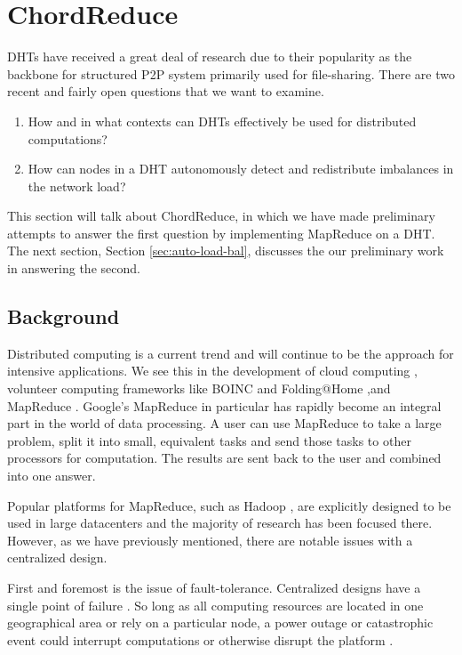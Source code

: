 \section{ChordReduce}
DHTs have received a great deal of research due to their popularity as the backbone for structured P2P system primarily used for file-sharing.
There are two recent and fairly open questions that we want to examine.

\begin{enumerate}
	\item How and in what contexts  can DHTs effectively be used for distributed computations?  
	\item How can nodes in a DHT autonomously detect and redistribute imbalances in the network load?
\end{enumerate}

This section will talk about ChordReduce, in which we have made preliminary attempts to answer the first question by implementing MapReduce on a DHT.
The next section, Section \ref{sec:auto-load-bal}, discusses the our preliminary work in answering the second.

\subsection{Background}

Distributed computing is a current trend and will continue to be the approach for intensive  applications.
We see this in the development of cloud computing \cite{p2p-cloud}, volunteer computing frameworks like BOINC \cite{anderson2004boinc} and Folding@Home \cite{larson2002folding},and MapReduce  \cite{mapreduce}.
Google's MapReduce  in particular has rapidly become an integral part in the world of data processing.  
A user can use MapReduce to take a large problem, split it into small, equivalent tasks and send those tasks to other processors for computation.  
The results are sent back to the user and combined into one answer. 

Popular platforms for MapReduce, such as Hadoop \cite{hadoop}  \cite{shvachko2010hadoop}, are explicitly designed to be used in large datacenters \cite{hadoopAssumptions} and the majority of research has been focused there.  
However, as we have previously mentioned, there are notable issues with a centralized design.

First and foremost is the issue of fault-tolerance.
Centralized designs have a single point of failure \cite{shvachko2010hadoop}.
So long as all computing resources are located in one geographical area or rely on a particular node, a power outage or catastrophic event could interrupt computations or otherwise disrupt the platform \cite{babaoglu2014people}.

